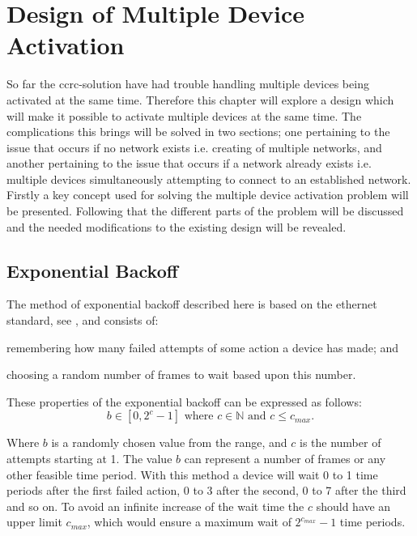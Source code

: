\chapter{Design of Multiple Device Activation}\label{chap:MDA-CCRC}
So far the \gls{ccrc}-solution have had trouble handling multiple devices being activated at the same time.
Therefore this chapter will explore a design which will make it possible to activate multiple devices at the same time.
The complications this brings will be solved in two sections; one pertaining to the issue that occurs if no network exists i.e. creating of multiple networks, and another pertaining to the issue that occurs if a network already exists i.e. multiple devices simultaneously attempting to connect to an established network.
Firstly a key concept used for solving the multiple device activation problem will be presented.
Following that the different parts of the problem will be discussed and the needed modifications to the existing design will be revealed.

\section{Exponential Backoff}
\label{sec:exponential_backoff}
The method of exponential backoff described here is based on the ethernet standard, see \citep{Ebackoff}, and consists of:
\begin{enumerate*}[label=\itshape \alph*\upshape)]
    \item remembering how many failed attempts of some action a device has made; and
    \item choosing a random number of frames to wait based upon this number.   
\end{enumerate*}
These properties of the exponential backoff can be expressed as follows:
\begin{equation}
     b \in [0, 2^c - 1] \text{ where } c \in \mathbb{N} \text{ and } {c \leq c_{max}}.
\end{equation}

\noindent
Where $b$ is a randomly chosen value from the range, and $c$ is the number of attempts starting at 1. 
The value $b$ can represent a number of frames or any other feasible time period.
With this method a device will wait 0 to 1 time periods after the first failed action, 0 to 3 after the second, 0 to 7 after the third and so on. 
To avoid an infinite increase of the wait time the $c$ should have an upper limit $c_{max}$, which would ensure a maximum wait of $2^{c_{max}}-1$ time periods.







